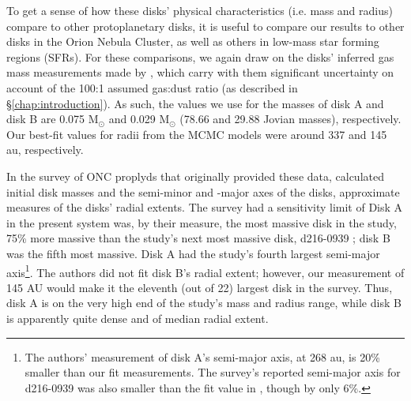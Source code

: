 


To get a sense of how these disks' physical characteristics (i.e. mass and radius) compare to other protoplanetary disks, it is useful to compare our results to other disks in the Orion Nebula Cluster, as well as others in low-mass star forming regions (SFRs). For these comparisons, we again draw on the disks' inferred gas mass measurements made by \citet{Williams2014}, which carry with them significant uncertainty on account of the 100:1 assumed gas:dust ratio (as described in \S\ref{chap:introduction}). As such, the values we use for the masses of disk A and disk B are 0.075 M$_\odot$ and 0.029 M$_\odot$ (78.66 and 29.88 Jovian masses), respectively. Our best-fit values for radii from the MCMC models were around 337 and 145 au, respectively.


In the survey of ONC proplyds that originally provided these data, \citet{Mann2014} calculated initial disk masses and the semi-minor and -major axes of the disks, approximate measures of the disks' radial extents. The survey had a sensitivity limit of  Disk A in the present system was, by their measure, the most massive disk in the study, 75\% more massive than the study's next most massive disk, d216-0939 \citet[which was the subject of][]{Factor2017} ; disk B was the fifth most massive. Disk A had the study's fourth largest semi-major axis\footnote{The authors' measurement of disk A's semi-major axis, at 268 au, is 20\% smaller than our fit measurements. The survey's reported semi-major axis for d216-0939 was also smaller than the fit value in \citet{Factor2017}, though by only 6\%.}. The authors did not fit disk B's radial extent; however, our measurement of 145 AU would make it the eleventh (out of 22) largest disk in the survey. Thus, disk A is on the very high end of the study's mass and radius range, while disk B is apparently quite dense and of median radial extent.

